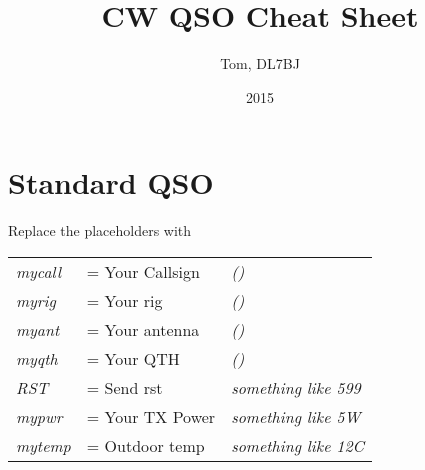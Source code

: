 \documentclass[10pt]{article}
\title{CW QSO Cheat Sheet}
\author{Tom, DL7BJ}
\date{2015}
\renewcommand{\maketitle}{%
{\begin{center}\Large \mythetitle\end{center}}

}
\begin{document}
\begin{multicols}{3}
\maketitle

\section{Standard QSO}
\vspace{\baselineskip}

Replace the placeholders with\\
\begin{tabular}{lll}
\textit{mycall} & = Your Callsign & \textit{(\hspace{3cm})}\\
\textit{myrig} & = Your rig & \textit{(\hspace{3cm})}\\
\textit{myant} & = Your antenna & \textit{(\hspace{3cm})}\\
\textit{myqth} & = Your QTH & \textit{(\hspace{3cm})}\\
\textit{RST} & = Send rst & \textit{something like 599}\\
\textit{mypwr} & = Your TX Power & \textit{something like 5W}\\
\textit{mytemp} & = Outdoor temp & \textit{something like 12C}\\
\end{tabular}
\vspace{\baselineskip}



\end{multicols}
\end{document}
